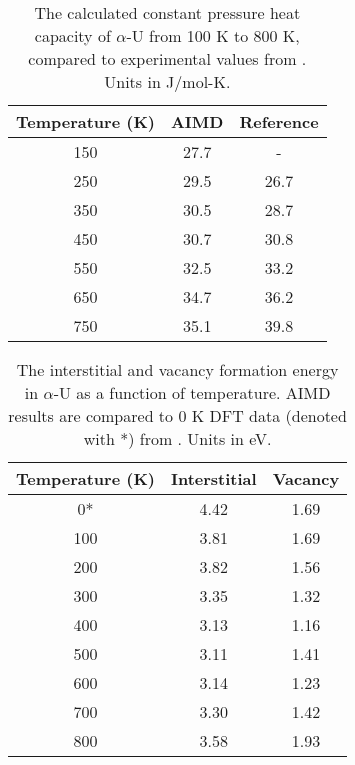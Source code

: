\documentclass[utf8]{frontiersSCNS} %
\begin{document}
\begin{table}[h]
\caption{The calculated constant pressure heat capacity of $\alpha$-U from 100 K to 800 K, compared to experimental values from \cite{konings2010}. Units in J/mol-K.} \label{tab:cp}
\begin{center}
\begin{tabular}{|c|c|c|}
	\hline
	Temperature (K) & AIMD & Reference \\
	 \hline
150 &	27.7	& -	 \\
250 &	29.5 & 26.7  \\
350 &	30.5	& 28.7 \\
450 &	30.7 & 30.8  \\
550 &	32.5 & 33.2  \\
650 &	34.7 & 36.2  \\
750 &	35.1 & 39.8  \\
	 \hline
\end{tabular}
\end{center}
\label{default}
\end{table}

\begin{table}[h]
\caption{The interstitial and vacancy formation energy in $\alpha$-U as a function of temperature. AIMD results are compared to 0 K DFT data (denoted with *) from \cite{wirth2011}. Units in eV.} \label{tab:eform}
\begin{center}
\begin{tabular}{|c|c|c|}
	\hline
	Temperature (K) & Interstitial & Vacancy \\
	 \hline
0* & 4.42 & 1.69 \\
100 &	3.81 &	1.69 \\
200 &	3.82 &	1.56 \\
300 &	3.35 &	1.32 \\
400 &	3.13 &	1.16 \\
500 &	3.11 &	1.41 \\
600 &	3.14 &	1.23 \\
700 &	3.30 & 1.42 \\
800 &	3.58 &	1.93 \\
	 \hline
\end{tabular}
\end{center}
\label{default}
\end{table}
\end{document}
